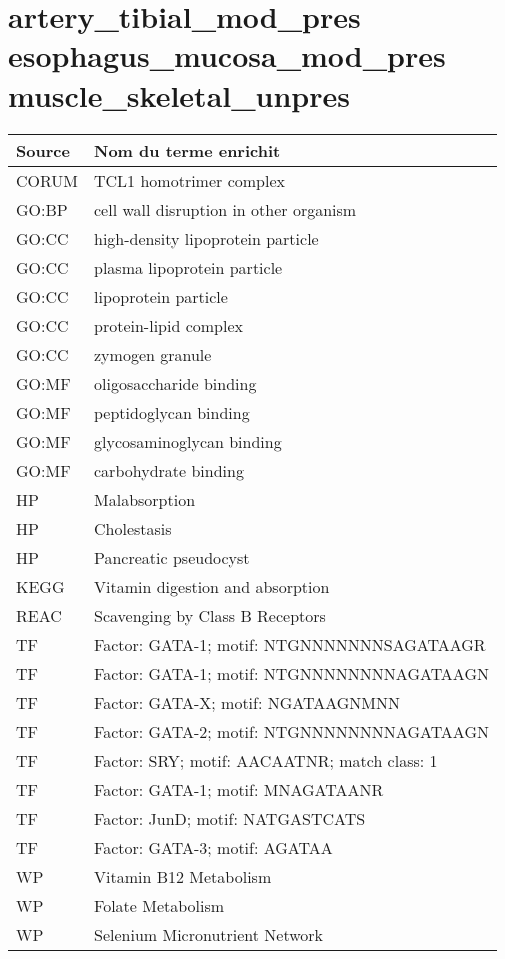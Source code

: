 \section*{artery\_tibial\_mod\_pres \newline esophagus\_mucosa\_mod\_pres \newline muscle\_skeletal\_unpres}

\begin{longtable}{ll}
\toprule
Source & Nom du terme enrichit\\
\midrule
CORUM & TCL1 homotrimer complex\\
GO:BP & cell wall disruption in other organism\\
GO:CC & high-density lipoprotein particle\\
GO:CC & plasma lipoprotein particle\\
GO:CC & lipoprotein particle\\
GO:CC & protein-lipid complex\\
GO:CC & zymogen granule\\
GO:MF & oligosaccharide binding\\
GO:MF & peptidoglycan binding\\
GO:MF & glycosaminoglycan binding\\
GO:MF & carbohydrate binding\\
HP & Malabsorption\\
HP & Cholestasis\\
HP & Pancreatic pseudocyst\\
KEGG & Vitamin digestion and absorption\\
REAC & Scavenging by Class B Receptors\\
TF & Factor: GATA-1; motif: NTGNNNNNNNSAGATAAGR\\
TF & Factor: GATA-1; motif: NTGNNNNNNNNAGATAAGN\\
TF & Factor: GATA-X; motif: NGATAAGNMNN\\
TF & Factor: GATA-2; motif: NTGNNNNNNNNAGATAAGN\\
TF & Factor: SRY; motif: AACAATNR; match class: 1\\
TF & Factor: GATA-1; motif: MNAGATAANR\\
TF & Factor: JunD; motif: NATGASTCATS\\
TF & Factor: GATA-3; motif: AGATAA\\
WP & Vitamin B12 Metabolism\\
WP & Folate Metabolism\\
WP & Selenium Micronutrient Network\\
\bottomrule
\end{longtable}

